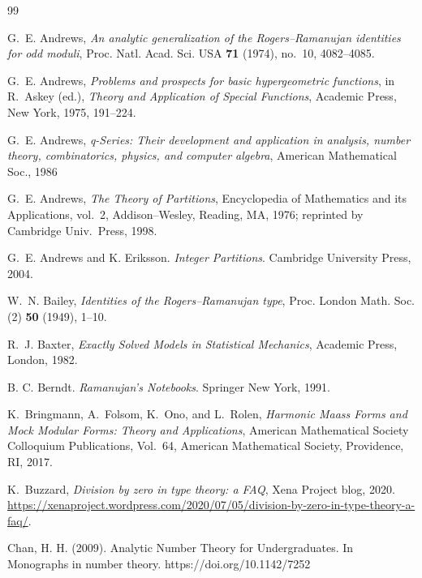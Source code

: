 \documentclass[12pt]{amsart}
\theoremstyle{definition}
\theoremstyle{remark}
\numberwithin{equation}{subsection}
\begin{document}
\begin{thebibliography}{99}



G.~E. Andrews, \emph{An analytic generalization of the Rogers--Ramanujan identities for odd moduli}, Proc. Natl. Acad. Sci. USA \textbf{71} (1974), no.~10, 4082--4085.

G.~E. Andrews, \emph{Problems and prospects for basic hypergeometric functions}, in R.~Askey (ed.), \emph{Theory and Application of Special Functions}, Academic Press, New York, 1975, 191--224.

G.~E. Andrews, \emph{q-Series: Their development and application in analysis, number theory, combinatorics, physics, and computer algebra}, American Mathematical Soc., 1986

G.~E. Andrews, \emph{The Theory of Partitions}, Encyclopedia of Mathematics and its Applications, vol.~2, Addison--Wesley, Reading, MA, 1976; reprinted by Cambridge Univ.\ Press, 1998.

G.~E. Andrews and K. Eriksson. \emph{Integer Partitions}. Cambridge University Press, 2004.

W.~N. Bailey, \emph{Identities of the Rogers--Ramanujan type}, Proc. London Math. Soc. (2) \textbf{50} (1949), 1--10.

R.~J. Baxter, \emph{Exactly Solved Models in Statistical Mechanics}, Academic Press, London, 1982.

B. C. Berndt. \emph{Ramanujan's Notebooks}. Springer New York, 1991.

K.~Bringmann, A.~Folsom, K.~Ono, and L.~Rolen,
\emph{Harmonic Maass Forms and Mock Modular Forms: Theory and Applications},
American Mathematical Society Colloquium Publications, Vol.~64,
American Mathematical Society, Providence, RI, 2017.

K.~Buzzard, \emph{Division by zero in type theory: a FAQ}, Xena Project blog, 2020. \url{https://xenaproject.wordpress.com/2020/07/05/division-by-zero-in-type-theory-a-faq/}.

Chan, H. H. (2009). Analytic Number Theory for Undergraduates. In Monographs in number theory. https://doi.org/10.1142/7252


\end{thebibliography}
\end{document}
